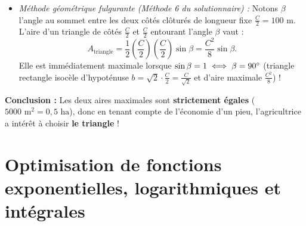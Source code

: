 \begin{exemple}
\begin{enumerate}[label=(\arabic*)]
\begin{itemize}
        \[
            \frac{\mathrm{d}(A_{\text{tri}}^2)}{\mathrm{d}b} = \frac{b}{8}(C^2 - 2b^2) = 0 \iff \boxed{b = \frac{C}{\sqrt{2}} = 100\sqrt{2} \simeq 141,42\text{ m}},
        \]
        d'où $\boxed{h = \sqrt{\frac{C^2}{4} - \frac{C^2}{8}} = \frac{C}{2\sqrt{2}} = 50\sqrt{2} \simeq 70,71\text{ m}}$ et $\boxed{A_{\text{triangle}} = \frac{1}{2}\cdot\frac{C}{\sqrt{2}}\cdot\frac{C}{2\sqrt{2}} = \frac{C^2}{8} = 5000\text{ m}^2 = 0,5\text{ ha}}$.
        \item \emph{Méthode géométrique fulgurante (Méthode 6 du solutionnaire) :} Notons $\beta$ l'angle au sommet entre les deux côtés clôturés de longueur fixe $\frac{C}{2} = 100\text{ m}$. L'aire d'un triangle de côtés $\frac{C}{2}$ et $\frac{C}{2}$ entourant l'angle $\beta$ vaut :
        \[
            A_{\text{triangle}} = \frac{1}{2}\left(\frac{C}{2}\right)\left(\frac{C}{2}\right)\sin\beta = \frac{C^2}{8}\sin\beta.
        \]
        Elle est immédiatement maximale lorsque $\sin\beta = 1 \iff \beta = 90\degree$ (triangle rectangle isocèle d'hypoténuse $b = \sqrt{2}\cdot\frac{C}{2} = \frac{C}{\sqrt{2}}$ et d'aire maximale $\frac{C^2}{8}$) !
    \end{itemize}
    \textbf{Conclusion :} Les deux aires maximales sont \textbf{strictement égales} ($5000\text{ m}^2 = 0,5\text{ ha}$), donc en tenant compte de l'économie d'un pieu, l'agricultrice a intérêt à choisir \textbf{le triangle} !
\end{enumerate}
\end{exemple}

\section{Optimisation de fonctions exponentielles, logarithmiques et intégrales}

